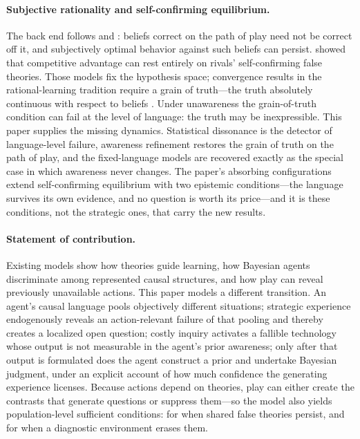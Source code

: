 \documentclass[11pt]{article}
\theoremstyle{definition}
\begin{document}
\paragraph{Subjective rationality and self-confirming equilibrium.}
The back end follows \citet{KalaiLehrer1993b} and \citet{FudenbergLevine1993}: beliefs correct on the path of play need not be correct off it, and subjectively optimal behavior against such beliefs can persist.
\citet{Ryall2003} showed that competitive advantage can rest entirely on rivals' self-confirming false theories.
Those models fix the hypothesis space; convergence results in the rational-learning tradition require a grain of truth---the truth absolutely continuous with respect to beliefs \citep{KalaiLehrer1993a}.
Under unawareness the grain-of-truth condition can fail at the level of language: the truth may be inexpressible.
This paper supplies the missing dynamics.
Statistical dissonance is the detector of language-level failure, awareness refinement restores the grain of truth on the path of play, and the fixed-language models are recovered exactly as the special case in which awareness never changes.
The paper's absorbing configurations extend self-confirming equilibrium with two epistemic conditions---the language survives its own evidence, and no question is worth its price---and it is these conditions, not the strategic ones, that carry the new results.

\paragraph{Statement of contribution.}
Existing models show how theories guide learning, how Bayesian agents discriminate among represented causal structures, and how play can reveal previously unavailable actions.
This paper models a different transition.
An agent's causal language pools objectively different situations; strategic experience endogenously reveals an action-relevant failure of that pooling and thereby creates a localized open question; costly inquiry activates a fallible technology whose output is not measurable in the agent's prior awareness; only after that output is formulated does the agent construct a prior and undertake Bayesian judgment, under an explicit account of how much confidence the generating experience licenses.
Because actions depend on theories, play can either create the contrasts that generate questions or suppress them---so the model also yields population-level sufficient conditions: for when shared false theories persist, and for when a diagnostic environment erases them.
\end{document}
